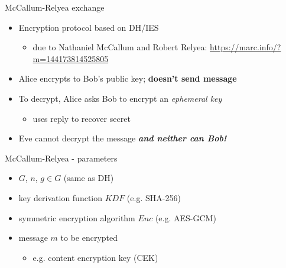 \documentclass[ignorenonframetext,aspectratio=169]{beamer}
\begin{document}
\begin{frame}{McCallum-Relyea exchange}
\protect\hypertarget{mccallum-relyea-exchange}{}

\begin{itemize}
\item Encryption protocol based on DH/IES

  \begin{itemize}
  \item due to Nathaniel McCallum and Robert Relyea:
	    \url{https://marc.info/?m=144173814525805}
  \end{itemize}
\item Alice encrypts to Bob's public key; \textbf{doesn't send message}
\item To decrypt, Alice asks Bob to encrypt an \emph{ephemeral key}

  \begin{itemize}
  \item uses reply to recover secret
  \end{itemize}
\item
  Eve cannot decrypt the message \textbf{\emph{and neither can Bob!}}
\end{itemize}

\end{frame}

\begin{frame}{McCallum-Relyea - parameters}
\protect\hypertarget{mccallum-relyea-parameters}{}
\begin{itemize}
\item $G$, $n$, $g \in G$ (same as DH)
\item key derivation function $KDF$ (e.g. SHA-256)
\item symmetric encryption algorithm \(Enc\) (e.g. AES-GCM)
\item message \(m\) to be encrypted
  \begin{itemize}
  \item e.g. content encryption key (CEK)
  \end{itemize}
\end{itemize}
\end{frame}
\end{document}
